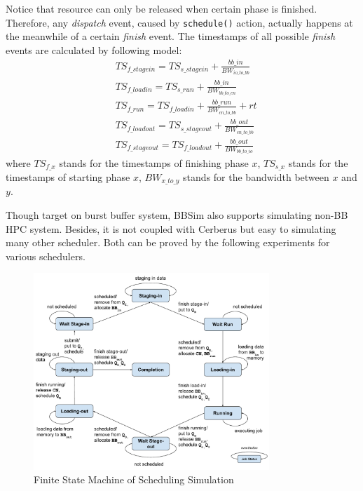 Notice that resource can only be released when certain phase is finished.
Therefore, any \textit{dispatch} event, caused by \texttt{schedule()} action, actually happens
at the meanwhile of a certain \textit{finish} event.
The timestamps of all possible \textit{finish} events are calculated by following model:
\begin{align}
        & TS_{f\_stagein} = TS_{s\_stagein} + \frac{bb\_in}{BW_{io\_to\_bb}}\label{Equ:FinIn} \\
        & TS_{f\_loadin} = TS_{s\_run} + \frac{bb\_in}{BW_{bb\_to\_cn}}\label{Equ:FinMemIn} \\
        & TS_{f\_run} = TS_{f\_loadin} + \frac{bb\_run}{BW_{cn\_to\_bb}} + rt\label{Equ:FinRun} \\
        & TS_{f\_loadout} = TS_{s\_stageout} + \frac{bb\_out}{BW_{cn\_to\_bb}}\label{Equ:FinMemOut} \\
        & TS_{f\_stageout} = TS_{f\_loadout} + \frac{bb\_out}{BW_{bb\_to\_io}} \label{Equ:FinOut}
\end{align}
where $TS_{f\_x}$ stands for the timestamps of finishing phase $x$,
$TS_{s\_x}$ stands for the timestamps of starting phase $x$,
$BW_{x\_to\_y}$ stands for the bandwidth between $x$ and $y$.

Though target on burst buffer system, BBSim also supports simulating non-BB HPC system.
Besides, it is not coupled with Cerberus but easy to simulating many other scheduler.
Both can be proved by the following experiments for various schedulers.

\begin{figure}[!t]
        \centering
        \includegraphics[width=3.5in]{3PhaseJobFSM}
        \caption{Finite State Machine of Scheduling Simulation}
        \label{Fig:JobFSM}
\end{figure}



